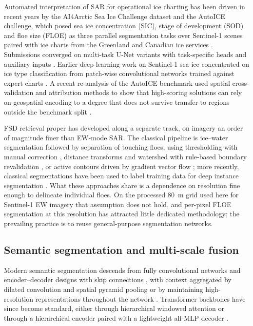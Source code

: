 \documentclass[preprint,12pt,authoryear]{elsarticle}
\begin{document}
Automated interpretation of SAR for operational ice charting has been driven in
recent years by the AI4Arctic Sea Ice Challenge dataset and the AutoICE
challenge, which posed sea ice concentration (SIC), stage of development (SOD)
and floe size (FLOE) as three parallel segmentation tasks over Sentinel-1 scenes
paired with ice charts from the Greenland and Canadian ice services
\citep{stokholm2024autoice,buushinkler2023rttai4arctic}.
Submissions converged on multi-task U-Net variants with task-specific heads and
auxiliary inputs \citep{chen2024mmseaice}. Earlier deep-learning work on
Sentinel-1 sea ice concentrated on ice type classification from patch-wise
convolutional networks trained against expert charts
\citep{boulze2020classification}. A recent re-analysis of the AutoICE benchmark
used spatial cross-validation and attribution methods to show that
high-scoring solutions can rely on geospatial encoding to a degree that does not
survive transfer to regions outside the benchmark split
\citep{jalayer2025enhancing}.

FSD retrieval proper has developed along a separate track, on imagery an order
of magnitude finer than EW-mode SAR. The classical pipeline is ice--water
segmentation followed by separation of touching floes, using thresholding with
manual correction \citep{toyota2006characteristics,toyota2011size}, distance
transforms and watershed with rule-based boundary revalidation
\citep{hwang2017practical}, or active contours driven by gradient vector flow
\citep{zhang2015imageprocessing}; more recently, classical segmentations have
been used to label training data for deep instance segmentation
\citep{zhang2023icefloe}. What these approaches share is a dependence on
resolution fine enough to delineate individual floes. On the processed 80~m
grid used here for Sentinel-1 EW imagery that assumption does not hold, and per-pixel FLOE
segmentation at this resolution has attracted little dedicated methodology; the
prevailing practice is to reuse general-purpose segmentation networks.

\subsection{Semantic segmentation and multi-scale fusion}

Modern semantic segmentation descends from fully convolutional networks
\citep{long2015fcn} and encoder--decoder designs with skip connections
\citep{ronneberger2015unet}, with context aggregated by dilated convolution and
spatial pyramid pooling \citep{chen2018deeplab} or by maintaining high-resolution
representations throughout the network \citep{wang2021hrnet}. Transformer
backbones have since become standard, either through hierarchical windowed
attention \citep{liu2021swin} or through a hierarchical encoder paired with a
lightweight all-MLP decoder \citep{xie2021segformer}.
\end{document}
